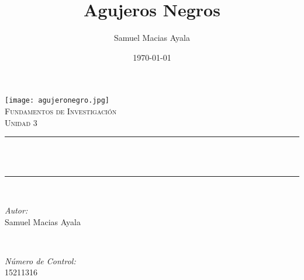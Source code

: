 \documentclass[12pt]{article}
\title{Agujeros Negros}								%
\author{Samuel Macias Ayala}								%
\date{\today}											%
\makeatletter
\let\thetitle\@title
\let\thedate\@date
\makeatother
\begin{document}

\begin{titlepage}
	\centering
    \vspace*{0.5 cm}
    \texttt{[image: agujeronegro.jpg]}\\[1.0 cm]	%
	\textsc{\Large Fundamentos de Investigación}\\[0.5 cm]				%
	\textsc{\large Unidad 3}\\[0.5 cm]				%
	\rule{\linewidth}{0.2 mm} \\[0.4 cm]
	{ \huge \bfseries \thetitle}\\
	\rule{\linewidth}{0.2 mm} \\[1.5 cm]
	
	\begin{minipage}{0.4\textwidth}
		\begin{flushleft} \large
			\emph{Autor:}\\
			Samuel Macias Ayala
			\end{flushleft}
			\end{minipage}~
			\begin{minipage}{0.4\textwidth}
			\begin{flushright} \large
			\emph{Número de Control:} \\
			15211316									%
		\end{flushright}
	\end{minipage}\\[2 cm]
	
	{\large  \thedate}\\[2 cm]
 
	\vfill
	
\end{titlepage}


\tableofcontents
\pagebreak

\end{document}
